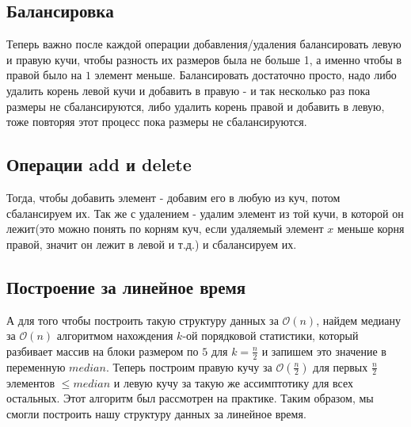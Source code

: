 \documentclass{article}
\begin{document}
\subsection*{Балансировка}
Теперь важно после каждой операции добавления/удаления балансировать левую и правую кучи, чтобы разность их размеров была не больше 1, а именно чтобы в правой было на $1$ элемент меньше. 
\newline
Балансировать достаточно просто, надо либо удалить корень левой кучи и добавить в правую - и так несколько раз пока размеры не сбалансируются, либо удалить корень правой и добавить в левую, тоже повторяя этот процесс пока размеры не сбалансируются. 
\subsection*{Операции add и delete}
Тогда, чтобы добавить элемент - добавим его в любую из куч, потом сбалансируем их. Так же с удалением - удалим элемент из той кучи, в которой он лежит(это можно понять по корням куч, если удаляемый элемент $x$ меньше корня правой, значит он лежит в левой и т.д.) и сбалансируем их.
\subsection*{Построение за линейное время}
А для того чтобы построить такую структуру данных за $\mathcal{O}(n)$, найдем медиану за $\mathcal{O}(n)$ алгоритмом нахождения $k$-ой порядковой статистики, который разбивает массив на блоки размером по $5$ для $k = \frac{n}{2}$ и запишем это значение в переменную $median$. Теперь построим правую кучу за $\mathcal{O}(\frac{n}{2})$ для первых $\frac{n}{2}$ элементов $\leq median$ и левую кучу за такую же ассимптотику для всех остальных. Этот алгоритм был рассмотрен на практике. Таким образом, мы смогли построить нашу структуру данных за линейное время.
\end{document}
